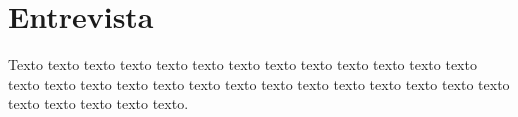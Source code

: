 \chapter{Entrevista}
\label{ape:entrevista}

Texto texto texto texto texto texto texto texto texto texto texto texto texto
texto texto texto texto texto texto texto texto texto texto texto texto texto
texto texto texto texto texto texto.

